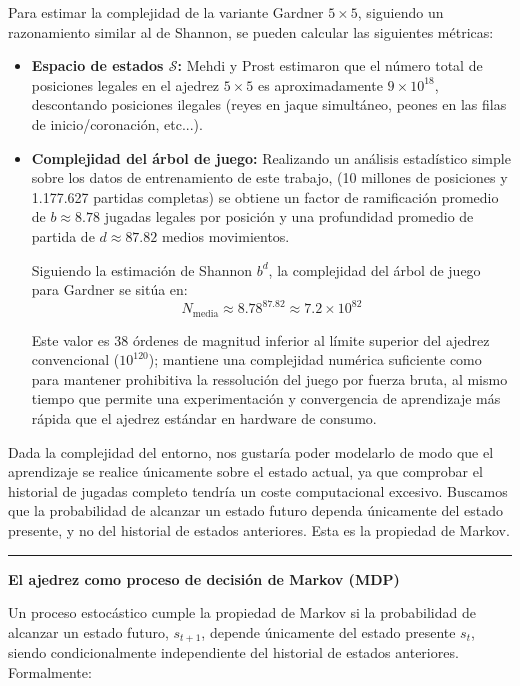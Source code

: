 \documentclass[12pt, a4paper]{article}
\let\cite\supercite
\begin{document}
Para estimar la complejidad de la variante Gardner $5\times5$, siguiendo un razonamiento similar al de Shannon, se pueden calcular las siguientes métricas:
\begin{itemize}
    \item \textbf{Espacio de estados $\mathcal{S}$:} Mehdi y Prost estimaron que el número total de posiciones legales en el ajedrez $5\times5$ es aproximadamente $9\times 10^{18}$, descontando posiciones ilegales (reyes en jaque simultáneo, peones en las filas de inicio/coronación, etc...)\cite{DBLP:journals/corr/MhallaP13}. 

    \item \textbf{Complejidad del árbol de juego:} Realizando un análisis estadístico simple sobre los datos de entrenamiento de este trabajo, (10 millones de posiciones y 1.177.627 partidas completas) se obtiene un factor de ramificación promedio de $b \approx 8.78$ jugadas legales por posición y una profundidad promedio de partida de $d \approx 87.82$ medios movimientos.
    
    Siguiendo la estimación de Shannon $b^d$, la complejidad del árbol de juego para Gardner se sitúa en:
    $$N_{\text{media}} \approx 8.78^{87.82} \approx 7.2 \times 10^{82}$$
    
    Este valor es 38 órdenes de magnitud inferior al límite superior del ajedrez convencional ($10^{120}$); mantiene una complejidad numérica suficiente como para mantener prohibitiva la ressolución del juego por fuerza bruta, al mismo tiempo que permite una experimentación y convergencia de aprendizaje más rápida que el ajedrez estándar en hardware de consumo.

\end{itemize}

Dada la complejidad del entorno, nos gustaría poder modelarlo de modo que el aprendizaje se realice únicamente sobre el estado actual, ya que comprobar el historial de jugadas completo tendría un coste computacional excesivo. Buscamos que la probabilidad de alcanzar un estado futuro dependa únicamente del estado presente, y no del historial de estados anteriores. Esta es la propiedad de Markov.

\rule{\textwidth}{0.2pt}
\textbf{El ajedrez como proceso de decisión de Markov (MDP)}

Un proceso estocástico cumple la propiedad de Markov si la probabilidad de alcanzar un estado futuro, $s_{t+1}$, depende únicamente del estado presente $s_t$, siendo condicionalmente independiente del historial de estados anteriores. Formalmente:
\end{document}
